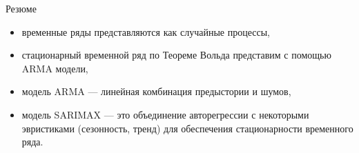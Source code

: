 \begin{frame}{Резюме}
    \begin{itemize}
        \item временные ряды представляются как случайные процессы,
        \item стационарный временной ряд по Теореме Вольда представим с помощью ARMA модели,
        \item модель ARMA --- линейная комбинация предыстории и шумов,
        \item модель SARIMAX --- это объединение авторегрессии с некоторыми эвристиками  (сезонность, тренд) для обеспечения стационарности временного ряда.
        
    \end{itemize}
\end{frame}

 
